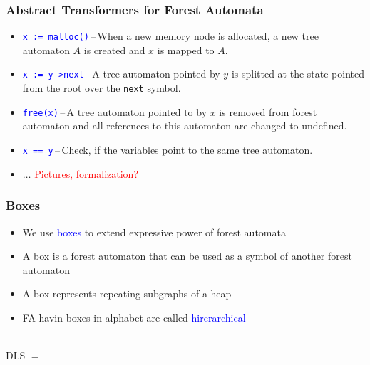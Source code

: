 \documentclass{beamer}
\newcommand{\hlbl}[1]{\textcolor{blue}{#1}}
\newcommand{\hlrd}[1]{\textcolor{red}{#1}}
\begin{document}
\begin{frame}
\frametitle{Abstract Transformers for Forest Automata}

	\begin{itemize}
		\item \hlbl{\texttt{x := malloc()}}\,--\,When a new memory node is allocated, a new tree automaton $A$
			is created and $x$ is mapped to $A$.
		\item \hlbl{\texttt{x := y->next}}\,--\,A tree automaton pointed by $y$ is splitted at the state
			pointed from the root over the \texttt{next} symbol.
		\item \hlbl{\texttt{free(x)}}\,--\,A tree automaton pointed to by $x$ is removed from forest automaton
			and all references to this automaton are changed to undefined.
		\item \hlbl{\texttt{x == y}}\,--\,Check, if the variables point to the same tree automaton.
		\item $\ldots$ \hlrd{Pictures, formalization?}
	\end{itemize}

\end{frame}


\begin{frame}
\frametitle{Boxes}

\begin{itemize}
		\item We use \hlbl{boxes} to extend expressive power of forest automata
		\item A box is a forest automaton that can be used as a symbol of another forest automaton
		\item A box represents repeating subgraphs of a heap
		\item FA havin boxes in alphabet are called \hlbl{hirerarchical}
	\end{itemize}
		\vspace{-0.8cm}
		\centering \\
		\vspace{0.7cm}
		\centering DLS $=$ \\
		\vspace{-0.8cm}
		\centering 
\end{frame}
\end{document}
